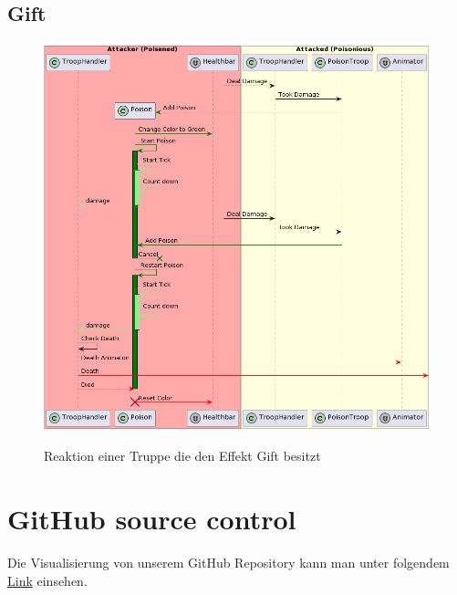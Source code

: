 \subsection{Gift}
\begin{figure}[H]
    \centering
    \includegraphics[width=15cm]{resources/Poison.png} \\
    \caption{Reaktion einer Truppe die den Effekt Gift besitzt}
\end{figure}


\section{GitHub source control}
Die Visualisierung von unserem GitHub Repository kann man unter folgendem \href{https://youtu.be/3uPTdjVXtNk}{Link} einsehen.